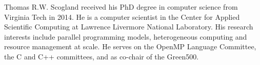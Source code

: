 \begin{IEEEbiography}{Thomas R.W. Scogland}
received his PhD degree in computer science from Virginia Tech in 2014.  He is a
computer scientist in the Center for Applied Scientific Computing at Lawrence
Livermore National Laboratory. His research interests include parallel
programming models, heterogeneous computing and resource management at scale.
He serves on the OpenMP Language Committee, the C and C++ committees, and as
co-chair of the Green500.
\end{IEEEbiography}

